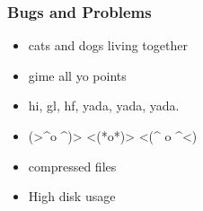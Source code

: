 \documentclass{beamer}
\begin{document}
\begin{frame}
  \frametitle{Bugs and Problems}
\begin{tcolorbox}[colback=green!5,colframe=green!40!black,title=usernames]
  \begin{itemize}
    \item  cats and dogs living together
    \item  gime all yo points
      \item hi, gl, hf, yada, yada, yada.
       \item (>\textasciicircum o \textasciicircum)> <(*o*)> <(\textasciicircum
         o \textasciicircum<)
  \end{itemize}

\end{tcolorbox}

\begin{tcolorbox}[colback=green!5,colframe=green!40!black,title=Performance]
  \begin{itemize}
  \item compressed files
  \item High disk usage
  \end{itemize}
\end{tcolorbox}
\end{frame}
\end{document}
